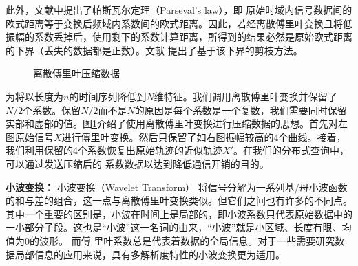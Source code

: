 此外，文献\cite{Shatkay1995The}中提出了帕斯瓦尔定理（Parseval's law），即
原始时域内信号数据间的欧式距离等于变换后频域内系数间的欧式距离。因此，若经离散傅里叶变换且将低振幅的系数丢掉后，使用剩下的系数计算距离，所得到的结果必然是原始欧式距离的下界（丢失的数据都是正数）。文献 \cite{KeoghDimReduction}提出了基于该下界的剪枝方法。

\begin{figure} [t]
	\centering
	\caption{离散傅里叶压缩数据\cite{KeoghDimReduction}}
	\label{fig-chapter2-DFT}
\end{figure}

为将以长度为$n$的时间序列降低到$N$维特征。我们调用离散傅里叶变换并保留了$N/2$个系数。保留$N/2$而不是$N$的原因是每个系数是一个复数，我们需要同时保留实部和虚部的值。图\ref{fig-chapter2-DFT}介绍了使用离散傅里叶变换进行压缩数据的思想。首先对左图原始信号$X$进行傅里叶变换。然后只保留了如右图振幅较高的4个曲线。接着，我们利用保留的4个系数恢复出原始轨迹的近似轨迹$X'$。在我们的分布式查询中，可以通过发送压缩后的 系数数据以达到降低通信开销的目的。

\textbf{小波变换：}
小波变换（Wavelet Transform） 将信号分解为一系列基/母小波函数的和与差的组合，这一点与离散傅里叶变换类似。但它们之间也有许多的不同点。其中一个重要的区别是，小波在时间上是局部的，即小波系数只代表原始数据中的一小部分子段。这也是“小波”这一名词的由来，“小波”就是小区域、长度有限、均值为0的波形。
而傅 里叶系数总是代表着数据的全局信息。对于一些需要研究数据局部信息的应用来说，具有多解析度特性的小波变换更为适用。

